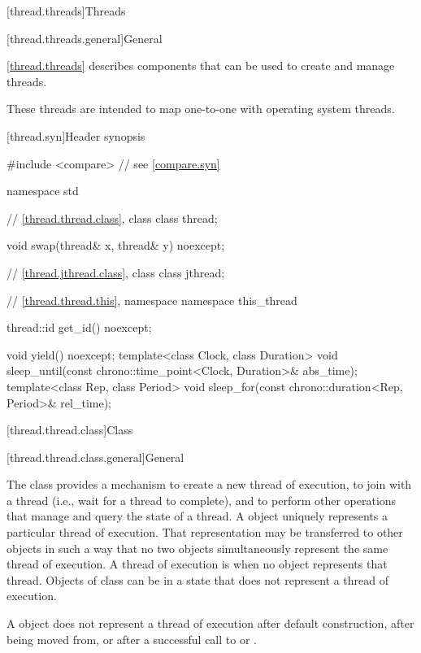 [thread.threads]{Threads}

[thread.threads.general]{General}

\pnum
\ref{thread.threads} describes components that can be used to create and manage threads.
\begin{note}
These threads are intended to map one-to-one with operating system threads.
\end{note}

[thread.syn]{Header  synopsis}

%
\begin{codeblock}
#include <compare>              // see \ref{compare.syn}

namespace std {
  // \ref{thread.thread.class}, class 
  class thread;

  void swap(thread& x, thread& y) noexcept;

  // \ref{thread.jthread.class}, class 
  class jthread;

  // \ref{thread.thread.this}, namespace 
  namespace this_thread {
    thread::id get_id() noexcept;

    void yield() noexcept;
    template<class Clock, class Duration>
      void sleep_until(const chrono::time_point<Clock, Duration>& abs_time);
    template<class Rep, class Period>
      void sleep_for(const chrono::duration<Rep, Period>& rel_time);
  }
}
\end{codeblock}

[thread.thread.class]{Class }

[thread.thread.class.general]{General}

\pnum
The class  provides a mechanism to create a new thread of execution, to join with
a thread (i.e., wait for a thread to complete), and to perform other operations that manage and
query the state of a thread. A  object uniquely represents a particular thread of
execution. That representation may be transferred to other  objects in such a way
that no two  objects simultaneously represent the same thread of execution. A
thread of execution is  when no  object represents that thread.
Objects of class  can be in a state that does not represent a thread of
execution.
\begin{note}
A  object does not represent a thread of execution after
default construction, after being moved from, or after a successful call to  or
.
\end{note}

